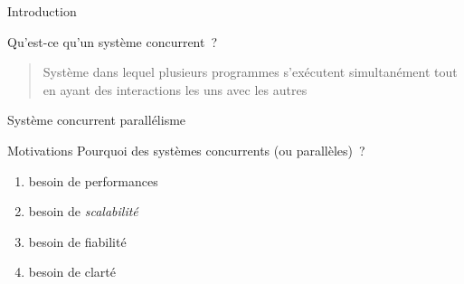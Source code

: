 \def\inc{inc1-intro}

\def\cpudb{Stanford CPU database -- \url {http://cpudb.stanford.edu/}}




\begin {frame} {Introduction}

    Qu'est-ce qu'un système concurrent~?

    \begin {quote}
	Système dans lequel plusieurs programmes s'exécutent
	simultanément tout en ayant des interactions les uns avec
	les autres

    \end {quote}

    \vspace* {5mm}

    Système concurrent \implique parallélisme

\end {frame}



\begin {frame} {Motivations}
    Pourquoi des systèmes concurrents (ou parallèles)~?

    \begin {enumerate}
	\item besoin de performances
	\item besoin de \emph {scalabilité}
	\item besoin de fiabilité
	\item besoin de clarté
    \end {enumerate}
\end {frame}

